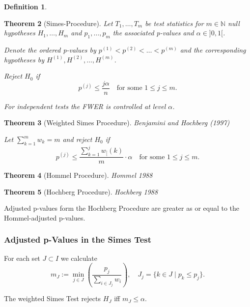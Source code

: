 \documentclass[a4paper, 10pt]{article}\usepackage[]{graphicx}\usepackage[]{color}
\numberwithin{equation}{section}
\theoremstyle{definition}
\newtheorem{Def}{Definition}[section]
\theoremstyle{plain}
\newtheorem{Theorem}[Def]{Theorem}
\newcommand{\N}{\ensuremath{\mathbb{N}}\xspace}
\begin{document}
\begin{appendix}
\begin{Def}
\end{Def}

\begin{Theorem}[Simes-Procedure] 
Let $T_1, \ldots, T_m$
be test statistics for $m\in\N$ null hypotheses $H_1, \ldots, H_m$ and
$p_1, \ldots, p_m$ the associated p-values and $\alpha\in]0,1[$.

Denote the ordered p-values by $p^{(1)}<p^{(2)}<\ldots<p^{(m)}$ 
and the corresponding hypotheses by $H^{(1)},H^{(2)},\ldots, H^{(m)}$.

Reject $H_0$ if
\[p^{(j)}\leq\frac{j\alpha}{n}\quad\text{for some $1\leq j\leq m$}.\]

For independent tests the FWER is controlled at level $\alpha$.
\end{Theorem}

\begin{Theorem}[Weighted Simes Procedure] 
Benjamini and Hochberg (1997)

Let $\sum_{k=1}^m w_k = m$ and reject $H_0$ if
\[p^{(j)}\leq\frac{\sum_{k=1}^jw_[{(k)}}{m}\cdot\alpha\quad\text{for some $1\leq j\leq m$}.\]

\end{Theorem}

\begin{Theorem}[Hommel Procedure] 
Hommel 1988
\end{Theorem}

\begin{Theorem}[Hochberg Procedure]
Hochberg 1988
\end{Theorem}

Adjusted p-values form the Hochberg Procedure are greater as or equal
to the Hommel-adjusted p-values.

\subsubsection*{Adjusted p-Values in the Simes Test}

For each set $J\subset I$ we calculate
\[m_J := \min\limits_{j\in J}\left(\frac{p_j}{\sum_{i\in J_j}w_i}\right),\quad J_j=\{k\in J\;|\; p_k\leq p_j\}.\]

The weighted Simes Test rejects $H_J$ iff $m_J\leq\alpha$.


\end{appendix}
\end{document}
